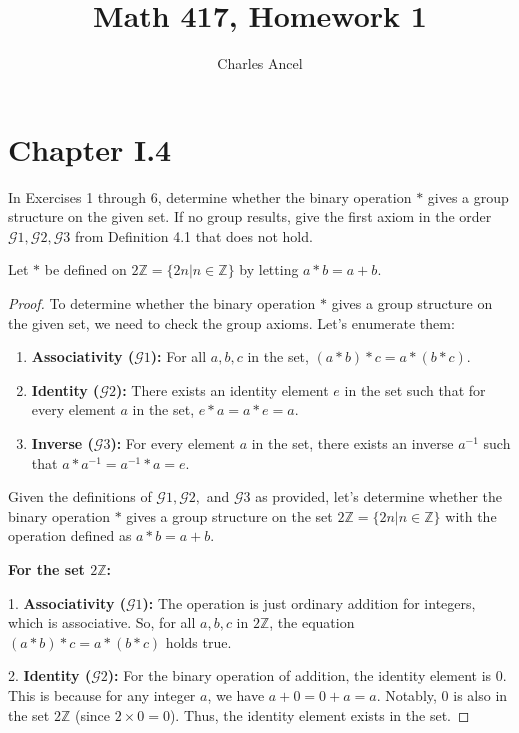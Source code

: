 \documentclass[12pt]{amsart}
\title{Math 417, Homework 1}
\author{Charles Ancel}
\theoremstyle{definition}
\numberwithin{equation}{section}
\theoremstyle{plain}
\newcommand{\Z}{\mathbb{Z}}
\begin{document}
\maketitle
    \section*{Chapter I.4}
    \begin{exercise}{2}
    In Exercises 1 through 6, determine whether the binary operation $*$ gives a group structure on the given set. If no group results, give the first axiom in the order $\mathcal{G}1,\mathcal{G}2,\mathcal{G}3$ from Definition 4.1 that does not hold.
    
    Let $*$ be defined on $2 \Z = \{2n | n \in \Z\}$ by letting $a * b = a + b$.
    \begin{proof}
        To determine whether the binary operation \(*\) gives a group structure on the given set, we need to check the group axioms. Let's enumerate them:
        \begin{enumerate}
            \item \textbf{Associativity (\(\mathcal{G}1\)):} For all \(a, b, c\) in the set, \((a * b) * c = a * (b * c)\).
            \item \textbf{Identity (\(\mathcal{G}2\)):} There exists an identity element \(e\) in the set such that for every element \(a\) in the set, \(e * a = a * e = a\).
            \item \textbf{Inverse (\(\mathcal{G}3\)):} For every element \(a\) in the set, there exists an inverse \(a^{-1}\) such that \(a * a^{-1} = a^{-1} * a = e\).
        \end{enumerate}
        
        Given the definitions of \(\mathcal{G}1, \mathcal{G}2,\) and \(\mathcal{G}3\) as provided, let's determine whether the binary operation \(*\) gives a group structure on the set \(2 \mathbb{Z} = \{2n | n \in \mathbb{Z}\}\) with the operation defined as \(a * b = a + b\).

\textbf{For the set \(2 \mathbb{Z}\):}

1. \textbf{Associativity (\(\mathcal{G}1\)):}
The operation is just ordinary addition for integers, which is associative. So, for all \(a, b, c\) in \(2 \mathbb{Z}\), the equation \((a * b) * c = a * (b * c)\) holds true.

2. \textbf{Identity (\(\mathcal{G}2\)):} 
For the binary operation of addition, the identity element is 0. This is because for any integer \(a\), we have \(a + 0 = 0 + a = a\). Notably, 0 is also in the set \(2 \mathbb{Z}\) (since \(2 \times 0 = 0\)). Thus, the identity element exists in the set.


\end{proof}
\end{exercise}
\end{document}
